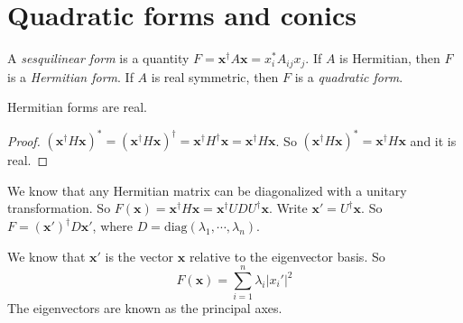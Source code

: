 \documentclass[a4paper]{article}
\begin{document}
\section{Quadratic forms and conics}
\begin{defi}
  A \emph{sesquilinear form} is a quantity $F = \mathbf{x}^\dagger A\mathbf{x} = x_i^*A_{ij}x_j$. If $A$ is Hermitian, then $F$ is a \emph{Hermitian form}. If $A$ is real symmetric, then $F$ is a \emph{quadratic form}.
\end{defi}

\begin{thm}
  Hermitian forms are real.
\end{thm}
\begin{proof}
  $(\mathbf{x}^\dagger H\mathbf{x})^* = (\mathbf{x}^\dagger H\mathbf{x})^\dagger = \mathbf{x}^\dagger H^\dagger\mathbf{x} = \mathbf{x}^\dagger H\mathbf{x}$. So $(\mathbf{x}^\dagger H\mathbf{x})^* = \mathbf{x}^\dagger H\mathbf{x}$ and it is real.
\end{proof}

We know that any Hermitian matrix can be diagonalized with a unitary transformation. So $F(\mathbf{x}) = \mathbf{x}^\dagger H\mathbf{x} = \mathbf{x}^\dagger UDU^\dagger \mathbf{x}$. Write $\mathbf{x}' = U^\dagger \mathbf{x}$. So $F = (\mathbf{x}')^\dagger D\mathbf{x}'$, where $D = \mathrm{diag}(\lambda_1,\cdots,\lambda_n)$.

We know that $\mathbf{x}'$ is the vector $\mathbf{x}$ relative to the eigenvector basis. So 
\[
  F(\mathbf{x}) = \sum_{i = 1}^n \lambda_i |x_i'|^2
\]
The eigenvectors are known as the principal axes.
\end{document}
